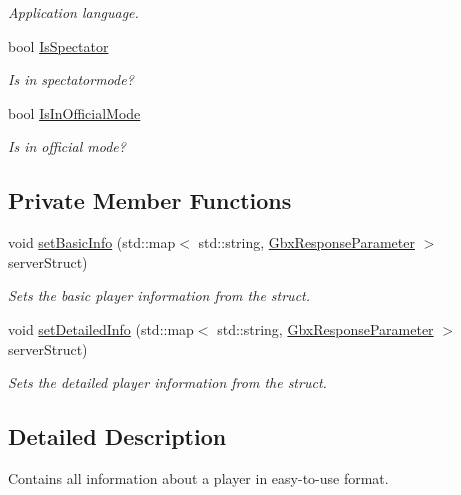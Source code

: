 \begin{DoxyCompactItemize}
\begin{DoxyCompactList}\small\item\em Application language. \end{DoxyCompactList}\item 
\hypertarget{structPlayer_a61ba0e32d336f5cd1eb152addf6848d2}{bool \hyperlink{structPlayer_a61ba0e32d336f5cd1eb152addf6848d2}{Is\-Spectator}}\label{structPlayer_a61ba0e32d336f5cd1eb152addf6848d2}

\begin{DoxyCompactList}\small\item\em Is in spectatormode? \end{DoxyCompactList}\item 
\hypertarget{structPlayer_a76e8b5298bcbe9ff694b6ed490ef7ca5}{bool \hyperlink{structPlayer_a76e8b5298bcbe9ff694b6ed490ef7ca5}{Is\-In\-Official\-Mode}}\label{structPlayer_a76e8b5298bcbe9ff694b6ed490ef7ca5}

\begin{DoxyCompactList}\small\item\em Is in official mode? \end{DoxyCompactList}\end{DoxyCompactItemize}
\subsection*{Private Member Functions}
\begin{DoxyCompactItemize}
\item 
void \hyperlink{structPlayer_ac4666bfba77342a37f3ab3628b26acd0}{set\-Basic\-Info} (std\-::map$<$ std\-::string, \hyperlink{classGbxResponseParameter}{Gbx\-Response\-Parameter} $>$ server\-Struct)
\begin{DoxyCompactList}\small\item\em Sets the basic player information from the struct. \end{DoxyCompactList}\item 
void \hyperlink{structPlayer_a179183e86a0b9a4b808593be96d65391}{set\-Detailed\-Info} (std\-::map$<$ std\-::string, \hyperlink{classGbxResponseParameter}{Gbx\-Response\-Parameter} $>$ server\-Struct)
\begin{DoxyCompactList}\small\item\em Sets the detailed player information from the struct. \end{DoxyCompactList}\end{DoxyCompactItemize}


\subsection{Detailed Description}
Contains all information about a player in easy-\/to-\/use format. 

